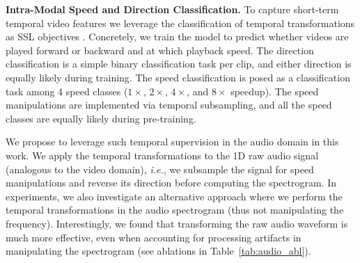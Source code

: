 \documentclass[letterpaper]{article} %
\newcommand{\ie}{\emph{i.e.}}
\begin{document}
\noindent \textbf{Intra-Modal Speed and Direction Classification.}
To capture short-term temporal video features we leverage the classification of temporal transformations as SSL objectives \cite{jenni2020video}.
Concretely, we train the model to predict whether videos are played forward or backward and at which playback speed.
The direction classification is a simple binary classification task per clip, and either direction is equally likely during training.
The speed classification is posed as a classification task among 4 speed classes ($1\times$, $2\times$, $4\times$, and $8\times$ speedup). The speed manipulations are implemented via temporal subsampling, and all the speed classes are equally likely during pre-training.

We propose to leverage such temporal supervision in the audio domain in this work.
We apply the temporal transformations to the 1D raw audio signal (analogous to the video domain), \ie, we subsample the signal for speed manipulations and reverse its direction before computing the spectrogram.
In experiments, we also investigate an alternative approach where we perform the temporal transformations in the audio spectrogram (thus not manipulating the frequency). Interestingly, we found that transforming the raw audio waveform is much more effective, even when accounting for processing artifacts in manipulating the spectrogram (see ablations in Table~\ref{tab:audio_abl}).

\end{document}
